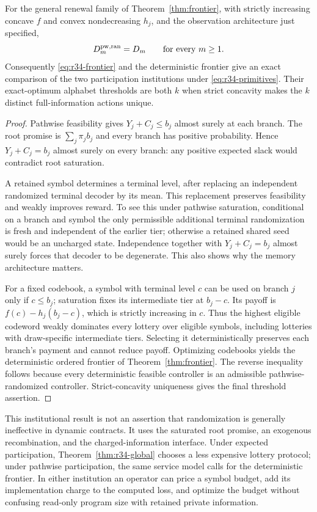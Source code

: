 \begin{theorem}\label{thm:r34-pathwise}
For the general renewal family of Theorem~\ref{thm:frontier}, with strictly increasing concave $f$ and convex nondecreasing $h_j$, and the observation architecture just specified,
\begin{equation}\label{eq:r34-pathwise}
 D_m^{\rm pw,ran}=D_m\qquad\text{for every }m\geq1.
\end{equation}
Consequently \eqref{eq:r34-frontier} and the deterministic frontier give an exact comparison of the two participation institutions under \eqref{eq:r34-primitives}. Their exact-optimum alphabet thresholds are both $k$ when strict concavity makes the $k$ distinct full-information actions unique.
\end{theorem}
\begin{proof}
Pathwise feasibility gives $Y_j+C_j\leq b_j$ almost surely at each branch. The root promise is $\sum_j\pi_jb_j$ and every branch has positive probability. Hence $Y_j+C_j=b_j$ almost surely on every branch: any positive expected slack would contradict root saturation.

A retained symbol determines a terminal level, after replacing an independent randomized terminal decoder by its mean. This replacement preserves feasibility and weakly improves reward. To see this under pathwise saturation, conditional on a branch and symbol the only permissible additional terminal randomization is fresh and independent of the earlier tier; otherwise a retained shared seed would be an uncharged state. Independence together with $Y_j+C_j=b_j$ almost surely forces that decoder to be degenerate. This also shows why the memory architecture matters.

For a fixed codebook, a symbol with terminal level $c$ can be used on branch $j$ only if $c\leq b_j$; saturation fixes its intermediate tier at $b_j-c$. Its payoff is $f(c)-h_j(b_j-c)$, which is strictly increasing in $c$. Thus the highest eligible codeword weakly dominates every lottery over eligible symbols, including lotteries with draw-specific intermediate tiers. Selecting it deterministically preserves each branch's payment and cannot reduce payoff. Optimizing codebooks yields the deterministic ordered frontier of Theorem~\ref{thm:frontier}. The reverse inequality follows because every deterministic feasible controller is an admissible pathwise-randomized controller. Strict-concavity uniqueness gives the final threshold assertion.\end{proof}

This institutional result is not an assertion that randomization is generally ineffective in dynamic contracts. It uses the saturated root promise, an exogenous recombination, and the charged-information interface. Under expected participation, Theorem~\ref{thm:r34-global} chooses a less expensive lottery protocol; under pathwise participation, the same service model calls for the deterministic frontier. In either institution an operator can price a symbol budget, add its implementation charge to the computed loss, and optimize the budget without confusing read-only program size with retained private information.
